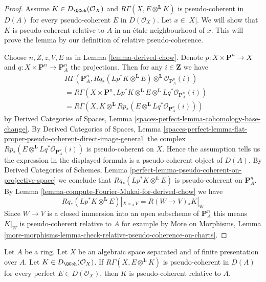\begin{proof}
Assume $K \in D_\QCoh(\mathcal{O}_X)$ and
$R\Gamma(X, E \otimes^\mathbf{L} K)$ is pseudo-coherent
in $D(A)$ for every pseudo-coherent $E$ in $D(\mathcal{O}_X)$.
Let $x \in |X|$. We will show that $K$ is pseudo-coherent relative to $A$
in an \'etale neighbourhood of $x$. This will prove the lemma
by our definition of relative pseudo-coherence.

\medskip\noindent
Choose $n, Z, z, V, E$ as in Lemma \ref{lemma-derived-chow}.
Denote $p : X \times \mathbf{P}^n \to X$ and
$q : X \times \mathbf{P}^n \to \mathbf{P}^n_A$
the projections.
Then for any $i \in \mathbf{Z}$ we have
\begin{align*}
& R\Gamma(\mathbf{P}^n_A,
Rq_*(Lp^*K \otimes^\mathbf{L} E)
\otimes^\mathbf{L}
\mathcal{O}_{\mathbf{P}^n_A}(i)) \\
& =
R\Gamma(X \times \mathbf{P}^n,
Lp^*K \otimes^\mathbf{L} E \otimes^\mathbf{L}
Lq^*\mathcal{O}_{\mathbf{P}^n_A}(i)) \\
& =
R\Gamma(X,
K \otimes^\mathbf{L} Rp_*(E \otimes^\mathbf{L}
Lq^*\mathcal{O}_{\mathbf{P}^n_A}(i)))
\end{align*}
by
Derived Categories of Spaces,
Lemma \ref{spaces-perfect-lemma-cohomology-base-change}.
By
Derived Categories of Spaces, Lemma
\ref{spaces-perfect-lemma-flat-proper-pseudo-coherent-direct-image-general}
the complex $Rp_*(E \otimes^\mathbf{L} Lq^*\mathcal{O}_{\mathbf{P}^n_A}(i))$
is pseudo-coherent on $X$. Hence the assumption tells us the expression
in the displayed formula is a pseudo-coherent object of $D(A)$.
By
Derived Categories of Schemes,
Lemma \ref{perfect-lemma-pseudo-coherent-on-projective-space}
we conclude that $Rq_*(Lp^*K \otimes^\mathbf{L} E)$ is
pseudo-coherent on $\mathbf{P}^n_A$.
By Lemma \ref{lemma-compute-Fourier-Mukai-for-derived-chow}
we have
$$
Rq_*(Lp^*K \otimes^\mathbf{L} E)|_{X \times_A V} =
R(W \to V)_*K|_W
$$
Since $W \to V$ is a closed immersion into an open subscheme of
$\mathbf{P}^n_A$ this means $K|_W$ is pseudo-coherent relative to $A$
for example by
More on Morphisms,
Lemma \ref{more-morphisms-lemma-check-relative-pseudo-coherence-on-charts}.
\end{proof}

\begin{lemma}
\label{lemma-characterize-pseudo-coh-improved}
Let $A$ be a ring. Let $X$ be an algebraic space separated and
of finite presentation over $A$. Let $K \in D_\QCoh(\mathcal{O}_X)$. If 
$R \Gamma (X, E \otimes ^{\mathbf{L}} K)$ is
pseudo-coherent in $D(A)$ for every perfect 
$E \in D(\mathcal{O}_X)$, then $K$ is pseudo-coherent
relative to $A$.
\end{lemma}

